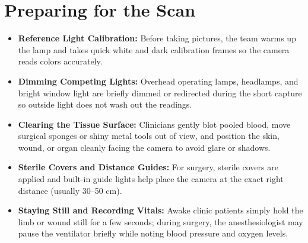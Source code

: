 \section{Preparing for the Scan}
\begin{itemize}
    \item \textbf{Reference Light Calibration:} Before taking pictures, the team warms up the lamp and takes quick white and dark calibration frames so the camera reads colors accurately.
    \item \textbf{Dimming Competing Lights:} Overhead operating lamps, headlamps, and bright window light are briefly dimmed or redirected during the short capture so outside light does not wash out the readings.
    \item \textbf{Clearing the Tissue Surface:} Clinicians gently blot pooled blood, move surgical sponges or shiny metal tools out of view, and position the skin, wound, or organ cleanly facing the camera to avoid glare or shadows.
    \item \textbf{Sterile Covers and Distance Guides:} For surgery, sterile covers are applied and built-in guide lights help place the camera at the exact right distance (usually 30--50 cm).
    \item \textbf{Staying Still and Recording Vitals:} Awake clinic patients simply hold the limb or wound still for a few seconds; during surgery, the anesthesiologist may pause the ventilator briefly while noting blood pressure and oxygen levels.
\end{itemize}

